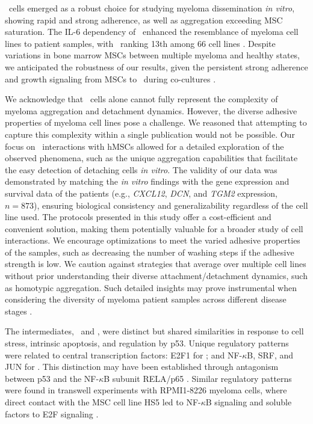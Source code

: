 \INA\ cells emerged as a robust choice for studying myeloma dissemination
\textit{in vitro}, showing rapid and strong adherence, as well as aggregation
exceeding MSC saturation. The IL-6 dependency of \INA\ enhanced the resemblance
of myeloma cell lines to patient samples, with \INA\ ranking 13th among 66 cell
lines \cite{sarinEvaluatingEfficacyMultiple2020}. Despite variations in bone
marrow MSCs between multiple myeloma and healthy states, we anticipated the
robustness of our results, given the persistent strong adherence and growth
signaling from MSCs to \INA\ during co-cultures
\cite{dotterweichContactMyelomaCells2016}.


We acknowledge that \INA\ cells alone cannot fully represent the complexity of
myeloma aggregation and detachment dynamics. However, the diverse adhesive
properties of myeloma cell lines pose a challenge. We reasoned that attempting
to capture this complexity within a single publication would not be possible.
Our focus on \INA\ interactions with hMSCs allowed for a detailed exploration of
the observed phenomena, such as the unique aggregation capabilities that
facilitate the easy detection of detaching cells \textit{in vitro}. The validity
of our data was demonstrated by matching the \textit{in vitro} findings with the
gene expression and survival data of the patients (e.g., \textit{CXCL12},
\textit{DCN}, and \textit{TGM2} expression, \( n=873 \)), ensuring biological
consistency and generalizability regardless of the cell line used. The protocols
presented in this study offer a cost-efficient and convenient solution, making
them potentially valuable for a broader study of cell interactions. We encourage
optimizations to meet the varied adhesive properties of the samples, such as
decreasing the number of washing steps if the adhesive strength is low. We
caution against strategies that average over multiple cell lines without prior
understanding their diverse attachment/detachment dynamics, such as homotypic
aggregation. Such detailed insights may prove instrumental when considering the
diversity of myeloma patient samples across different disease stages
\cite{kawanoHomotypicCellAggregations1991, okunoVitroGrowthPattern1991}.

The intermediates, \nMAina\ and \MAina, were distinct but shared similarities in
response to cell stress, intrinsic apoptosis, and regulation by p53. Unique
regulatory patterns were related to central transcription factors: E2F1 for
\nMAina; and NF-$\kappa$B, SRF, and JUN for \MAina. This distinction may have
been established through antagonism between p53 and the NF-$\kappa$B subunit
RELA/p65 \cite{wadgaonkarCREBbindingProteinNuclear1999, websterTranscriptionalCrossTalk1999}. Similar
regulatory patterns were found in transwell experiments with RPMI1-8226 myeloma
cells, where direct contact with the MSC cell line HS5 led to NF-$\kappa$B
signaling and soluble factors to E2F signaling \cite{dziadowiczBoneMarrowStromaInduced2022}.


